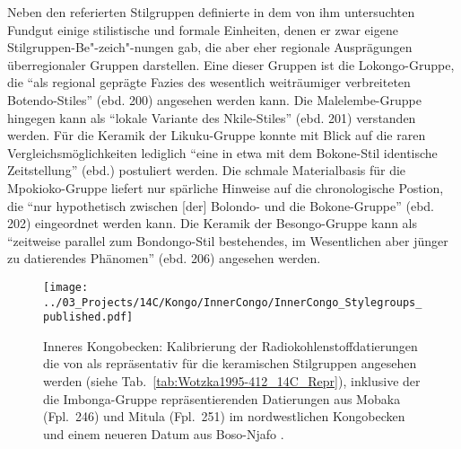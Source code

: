 Neben den referierten Stilgruppen definierte \textcite{Wotzka.1995} in dem von ihm untersuchten Fundgut einige stilistische und formale Einheiten, denen er zwar eigene Stilgruppen-Be"-zeich"-nungen gab, die aber eher regionale Ausprägungen überregionaler Gruppen darstellen. Eine dieser Gruppen ist die Lokongo-Gruppe, die \enquote{als regional geprägte Fazies des wesentlich weiträumiger verbreiteten Botendo-Stiles} (ebd. 200) angesehen werden kann. Die Malelembe-Gruppe hingegen kann als \enquote{lokale Variante des Nkile-Stiles} (ebd. 201) verstanden werden. Für die Keramik der Likuku-Gruppe konnte mit Blick auf die raren Vergleichsmöglichkeiten lediglich \enquote{eine in etwa mit dem Bokone-Stil identische Zeitstellung} (ebd.) postuliert werden. Die schmale Materialbasis für die Mpokioko-Gruppe liefert nur spärliche Hinweise auf die chronologische Postion, die \enquote{nur hypothetisch zwischen [der] Bolondo- und die Bokone-Gruppe} (ebd. 202) eingeordnet werden kann. Die Keramik der Besongo-Gruppe kann als \enquote{zeitweise parallel zum Bondongo-Stil bestehendes, im Wesentlichen aber jünger zu datierendes Phänomen} (ebd. 206) angesehen werden. 

\afterpage{%
	
}

\begin{figure*}[p]
	\centering
	\texttt{[image: ../03\_Projects/14C/Kongo/InnerCongo/InnerCongo\_Stylegroups\_published.pdf]}
	\caption{Inneres Kongobecken: Kalibrierung der Radiokohlenstoffdatierungen die von \textcite[67--210, 412]{Wotzka.1995} als repräsentativ für die keramischen Stilgruppen angesehen werden (siehe Tab.~\ref{tab:Wotzka1995-412_14C_Repr}), inklusive der die Imbonga-Gruppe repräsentierenden Datierungen aus Mobaka (Fpl.~246) und Mitula (Fpl.~251) im nordwestlichen Kongobecken und einem neueren Datum aus Boso-Njafo \parencite{Kahlheber.2014}.}
	\label{fig:14C_InnerCongo_Stylegroups}
\end{figure*}


